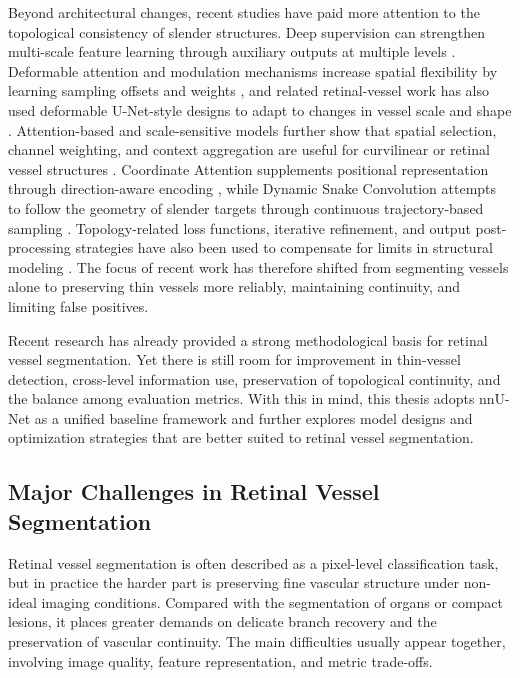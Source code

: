 \documentclass[a4paper,11pt]{article}
\begin{document}
Beyond architectural changes, recent studies have paid more attention to the topological consistency of slender structures. Deep supervision can strengthen multi-scale feature learning through auxiliary outputs at multiple levels \cite{lee2015dsn}. Deformable attention and modulation mechanisms increase spatial flexibility by learning sampling offsets and weights \cite{zhu2021deformabledetr,zhu2019dcnv2}, and related retinal-vessel work has also used deformable U-Net-style designs to adapt to changes in vessel scale and shape \cite{jin2019dunet}. Attention-based and scale-sensitive models further show that spatial selection, channel weighting, and context aggregation are useful for curvilinear or retinal vessel structures \cite{mou2019csnet,wu2021scsnet}. Coordinate Attention supplements positional representation through direction-aware encoding \cite{hou2021coordatt}, while Dynamic Snake Convolution attempts to follow the geometry of slender targets through continuous trajectory-based sampling \cite{qi2023dsc}. Topology-related loss functions, iterative refinement, and output post-processing strategies have also been used to compensate for limits in structural modeling \cite{li2020iternet,shit2021cldice}. The focus of recent work has therefore shifted from segmenting vessels alone to preserving thin vessels more reliably, maintaining continuity, and limiting false positives.

Recent research has already provided a strong methodological basis for retinal vessel segmentation. Yet there is still room for improvement in thin-vessel detection, cross-level information use, preservation of topological continuity, and the balance among evaluation metrics. With this in mind, this thesis adopts nnU-Net as a unified baseline framework and further explores model designs and optimization strategies that are better suited to retinal vessel segmentation.

\subsection{Major Challenges in Retinal Vessel Segmentation}
Retinal vessel segmentation is often described as a pixel-level classification task, but in practice the harder part is preserving fine vascular structure under non-ideal imaging conditions. Compared with the segmentation of organs or compact lesions, it places greater demands on delicate branch recovery and the preservation of vascular continuity. The main difficulties usually appear together, involving image quality, feature representation, and metric trade-offs.
\end{document}
